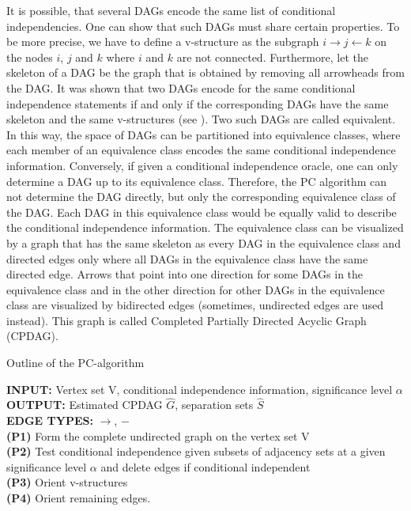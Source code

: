 \documentclass[article]{jss}
\begin{document}
It is possible, that several DAGs encode the same list of conditional
independencies. One can show that such DAGs must share certain
properties. To be more precise, we have to define a v-structure as the
subgraph $i \rightarrow j \leftarrow k$ on the nodes $i$, $j$ and $k$ where
$i$ and $k$ are not connected. Furthermore, let the skeleton of a DAG be
the graph that is obtained by removing all arrowheads from the DAG. It was
shown that two DAGs encode for the same conditional independence statements
if and only if the corresponding DAGs have the same skeleton and the same
 v-structures (see \cite{VermaPearl90}). Two such DAGs are called
equivalent. In this way, the space of DAGs can be partitioned into
equivalence classes, where each member of an equivalence class encodes the
same conditional independence information. Conversely, if given a
conditional independence oracle, one can only determine a DAG up to its
equivalence class. Therefore, the PC algorithm can not determine the DAG
directly, but only the corresponding equivalence class of the DAG. Each DAG
in this equivalence class would be equally valid to describe the
conditional independence information. The equivalence class can be
visualized by a graph that has the same skeleton as every DAG in the
equivalence class and directed edges only where all DAGs in the equivalence
class have the same directed edge. Arrows that point into one direction for
some DAGs in the equivalence class and in the other direction for other
DAGs in the equivalence class are visualized by bidirected edges
(sometimes, undirected edges are used instead). This graph is called
Completed Partially Directed Acyclic Graph (CPDAG).

\begin{algorithm}[h]
\caption{Outline of the PC-algorithm}
\label{pc}
\begin{algorithmic}
\STATE \textbf{INPUT:} Vertex set V, conditional independence information,
significance level $\alpha$\\
\STATE \textbf{OUTPUT:} Estimated CPDAG $\hat{G}$, separation sets $\hat{S}$\\
\STATE \textbf{EDGE TYPES:} $\rightarrow$, $-$\\ 
\STATE \textbf{(P1)} Form the complete undirected graph on the vertex
set V\\
\STATE \textbf{(P2)} Test conditional independence given subsets of
adjacency sets at a given significance level $\alpha$ and delete edges if
conditional independent\\ 
\STATE \textbf{(P3)} Orient v-structures\\
\STATE \textbf{(P4)} Orient remaining edges.\\
\end{algorithmic}
\label{algo:pc}
\end{algorithm}
\end{document}
